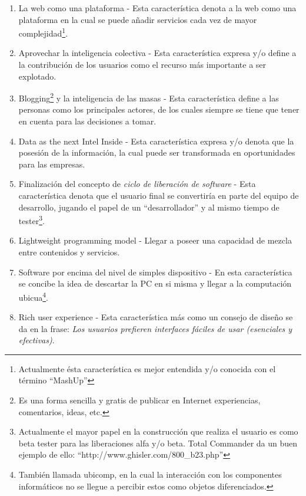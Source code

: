 \documentclass[oneside,12pt,a4paper]{memoir}%
\begin{document}
	\begin{enumerate}
	  \item La web como una plataforma - Esta caracter\'istica denota a la web
	  como una plataforma en la cual se puede a\~nadir servicios cada vez de mayor
	  complejidad\footnote{Actualmente \'esta caracter\'istica es mejor
	  entendida y/o conocida con el t\'ermino ``MashUp''}.
	  \item Aprovechar la inteligencia colectiva -  Esta caracter\'istica expresa
	  y/o define a la contribuci\'on de los usuarios como el recurso m\'as
	  importante a ser explotado.
	  \item Blogging\footnote{Es una forma sencilla y gratis de publicar en
	  Internet experiencias, comentarios, ideas, etc.} y la inteligencia de las
	  masas - Esta caracter\'istica define a las personas como los principales
	  actores, de los cuales siempre se tiene que tener en cuenta para las
	 decisiones a tomar.
	  \item Data as the next Intel Inside - Esta caracter\'istica expresa y/o
	  denota que la posesi\'on de la informaci\'on, la cual puede ser transformada
	  en oportunidades para las empresas.
	  \item Finalizaci\'on del concepto de \textit{ciclo de liberaci\'on de
	  software} - Esta caracter\'istica denota que el usuario final se
	  convertir\'ia en parte del equipo de desarrollo, jugando el papel de un
	  ``desarrollador'' y al mismo tiempo de tester\footnote{Actualmente el mayor
	  papel en la construcci\'on que realiza el usuario es como beta tester para
	  las liberaciones alfa y/o beta. Total Commander da un buen ejemplo de ello:
	  ``http://www.ghisler.com/800\_b23.php''}.
	  \item Lightweight programming model - Llegar a poseer una capacidad de mezcla
	  entre contenidos y servicios.
	  \item Software por encima del nivel de simples dispositivo - En esta
	  caracter\'istica se concibe la idea de descartar la PC en si misma y llegar
	  a la computaci\'on ubicua\footnote{Tambi\'en llamada ubicomp, en
	  la cual la interacci\'on con los componentes inform\'aticos no se llegue a
	  percibir estos como objetos diferenciados.}.
	  \item Rich user experience - Esta caracter\'istica m\'as como un consejo
	  de dise\~no se da en la frase: \textit{Los usuarios prefieren interfaces
	  f\'aciles de usar (esenciales y efectivas)}.
	\end{enumerate}
	
\end{document}
